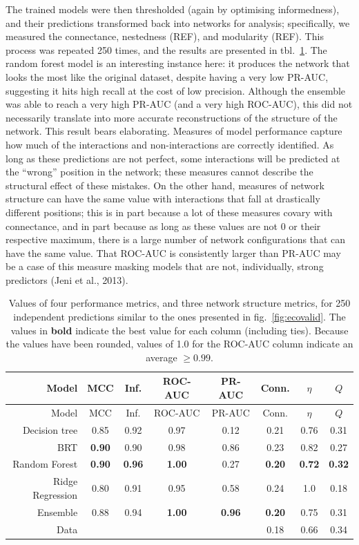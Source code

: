 \documentclass[11pt]{article}
\begin{document}
The trained models were then thresholded (again by optimising
informedness), and their predictions transformed back into networks for
analysis; specifically, we measured the connectance, nestedness (REF),
and modularity (REF). This process was repeated 250 times, and the
results are presented in tbl.~\ref{tbl:comparison}. The random forest
model is an interesting instance here: it produces the network that
looks the most like the original dataset, despite having a very low
PR-AUC, suggesting it hits high recall at the cost of low precision.
Although the ensemble was able to reach a very high PR-AUC (and a very
high ROC-AUC), this did not necessarily translate into more accurate
reconstructions of the structure of the network. This result bears
elaborating. Measures of model performance capture how much of the
interactions and non-interactions are correctly identified. As long as
these predictions are not perfect, some interactions will be predicted
at the ``wrong'' position in the network; these measures cannot describe
the structural effect of these mistakes. On the other hand, measures of
network structure can have the same value with interactions that fall at
drastically different positions; this is in part because a lot of these
measures covary with connectance, and in part because as long as these
values are not 0 or their respective maximum, there is a large number of
network configurations that can have the same value. That ROC-AUC is
consistently larger than PR-AUC may be a case of this measure masking
models that are not, individually, strong predictors (Jeni et al.,
2013).

\hypertarget{tbl:comparison}{}
\begin{longtable}[]{@{}rccccccc@{}}
\caption{\label{tbl:comparison}Values of four performance metrics, and
three network structure metrics, for 250 independent predictions similar
to the ones presented in fig.~\ref{fig:ecovalid}. The values in
\textbf{bold} indicate the best value for each column (including ties).
Because the values have been rounded, values of 1.0 for the ROC-AUC
column indicate an average \(\ge 0.99\).}\tabularnewline
\toprule
Model & MCC & Inf. & ROC-AUC & PR-AUC & Conn. & \(\eta\) &
\(Q\)\tabularnewline
\midrule
\endfirsthead
\toprule
Model & MCC & Inf. & ROC-AUC & PR-AUC & Conn. & \(\eta\) &
\(Q\)\tabularnewline
\midrule
\endhead
Decision tree & 0.85 & 0.92 & 0.97 & 0.12 & 0.21 & 0.76 &
0.31\tabularnewline
BRT & \textbf{0.90} & 0.90 & 0.98 & 0.86 & 0.23 & 0.82 &
0.27\tabularnewline
Random Forest & \textbf{0.90} & \textbf{0.96} & \textbf{1.00} & 0.27 &
\textbf{0.20} & \textbf{0.72} & \textbf{0.32}\tabularnewline
Ridge Regression & 0.80 & 0.91 & 0.95 & 0.58 & 0.24 & 1.0 &
0.18\tabularnewline
Ensemble & 0.88 & 0.94 & \textbf{1.00} & \textbf{0.96} & \textbf{0.20} &
0.75 & 0.31\tabularnewline
Data & & & & & 0.18 & 0.66 & 0.34\tabularnewline
\bottomrule
\end{longtable}
\end{document}
